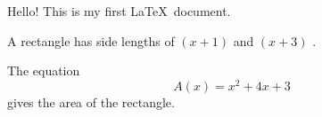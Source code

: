 \documentclass[12pt]{article}
\begin{document}
Hello! This is my first \LaTeX\ document.

A rectangle has side lengths of $(x+1)$ and $(x+3)$ .

The equation $$A(x)=x^2+4x+3$$ gives the area of the rectangle.
\end{document}
